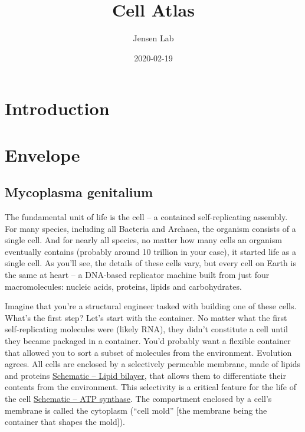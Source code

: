 \documentclass[]{tufte-book}
\title{Cell Atlas}
\author{Jensen Lab}
\date{2020-02-19}
\begin{document}
\maketitle



{
\setcounter{tocdepth}{1}
\tableofcontents
}

\hypertarget{introduction}{%
\chapter{Introduction}\label{introduction}}

\hypertarget{envelope}{%
\chapter{Envelope}\label{envelope}}

\hypertarget{mycoplasma-genitalium}{%
\section{Mycoplasma genitalium}\label{mycoplasma-genitalium}}

The fundamental unit of life is the cell -- a contained self-replicating assembly. For many species, including all Bacteria and Archaea, the organism consists of a single cell. And for nearly all species, no matter how many cells an organism eventually contains (probably around 10 trillion in your case), it started life as a single cell. As you'll see, the details of these cells vary, but every cell on Earth is the same at heart -- a DNA-based replicator machine built from just four macromolecules: nucleic acids, proteins, lipids and carbohydrates.

Imagine that you're a structural engineer tasked with building one of these cells. What's the first step? Let's start with the container. No matter what the first self-replicating molecules were (likely RNA), they didn't constitute a cell until they became packaged in a container. You'd probably want a flexible container that allowed you to sort a subset of molecules from the environment. Evolution agrees. All cells are enclosed by a selectively permeable membrane, made of lipids and proteins \protect\hyperlink{fig:2-1-1}{Schematic -- Lipid bilayer}, that allows them to differentiate their contents from the environment. This selectivity is a critical feature for the life of the cell \protect\hyperlink{fig:2-1-2}{Schematic -- ATP synthase}. The compartment enclosed by a cell's membrane is called the cytoplasm (``cell mold'' {[}the membrane being the container that shapes the mold{]}).
\end{document}
